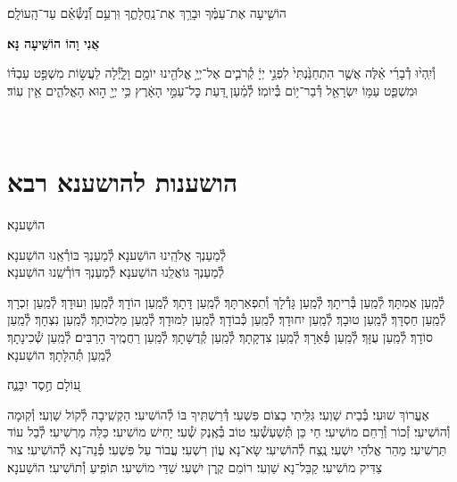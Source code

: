 \documentclass[twoside, openany, parskip=half, 11pt]{book}
\begin{document}
הוֹשִׁ֤יעָה אֶת־עַמֶּ֗ךָ וּבָרֵ֥ךְ אֶת־נַֽחֲלָתֶ֑ךָ וּֽרְעֵ֥ם וְ֯֝נַשְּׂ֯אֵ֗ם עַד־הָֽעוֹלָֽם׃


\begin{large}
\textbf{אֲנִי וָהוֹ הוֹשִֽׁיעָה נָּא׃}
\end{large}

וְ֯יִֽהְי֨וּ דְ֯בָרַ֜י אֵ֗לֶּה אֲשֶׁ֤ר הִתְחַנַּ֙נְתִּי֙ לִפְנֵ֣י יְיָ֔ קְ֯רֹבִ֛ים אֶל־יְיָ֥ אֱלֹהֵ֖ינוּ יוֹמָ֣ם וָלָ֑יְ֯לָה לַעֲשׂ֣וֹת מִשְׁפַּ֣ט עַבְדּ֗וֹ וּמִשְׁפַּ֛ט עַמּ֥וֹ יִשְׂרָאֵ֖ל דְּ֯בַר־י֥וֹם בְּ֯יוֹמֽוֹ׃ לְ֯מַ֗עַן דַּ֚עַת כׇּל־עַמֵּ֣י הָאָ֔רֶץ כִּ֥י יְיָ֖ ה֣וּא הָאֱלֹהִ֑ים אֵ֖ין עֽוֹד׃

\vfill
{}\\

\clearpage

\vspace{-1\baselineskip}
\section[הושענות להושענא רבא]{ הושענות להושענא רבא }

\begin{Large}
הוֹשַׁענָא׃
\end{Large}


לְ֯מַעַנְךָ אֱלֹהֵֽינוּ הוֹשַׁענָא׃ לְ֯מַעַנְךָ בּוֹרְ֯אֵֽנוּ הוֹשַׁענָא׃\\
לְ֯מַעַנְךָ גּוֹאֲלֵֽנוּ הוֹשַׁענָא׃ לְ֯מַעַנְךָ דּוֹרְ֯שֵֽׁנוּ הוֹשַׁענָא׃

לְ֯מַֽעַן אֲמִתָּךְ׃ לְ֯מַֽעַן בְּ֯רִיתָךְ׃ לְ֯מַֽעַן גָּדְ֯לָךְ וְ֯תִפְאַרְתָּךְ׃ לְ֯מַֽעַן דָּתָךְ׃ לְ֯מַֽעַן הוֹדָךְ׃ לְ֯מַֽעַן וִעוּדָךְ׃ לְ֯מַֽעַן זִכְרָךְ׃ לְ֯מַֽעַן חַסְדָּךְ׃ לְ֯מַֽעַן טוּבָךְ׃ לְ֯מַֽעַן יִחוּדָךְ׃ לְ֯מַֽעַן כְּ֯בוֹדָךְ׃ לְ֯מַֽעַן לִמּוּדָךְ׃ לְ֯מַֽעַן מַלְכוּתָךְ׃ לְ֯מַֽעַן נִצְחָךְ׃ לְ֯מַֽעַן סוֹדָךְ׃ לְ֯מַֽעַן עֻזָּךְ׃ לְ֯מַֽעַן פְּ֯אֵרָךְ׃ לְ֯מַֽעַן צִדְקָתָךְ׃ לְ֯מַֽעַן קְ֯דֻשָּׁתָךְ׃ לְ֯מַֽעַן רַחֲמֶֽיךָ הָרַבִּים׃
לְ֯מַֽעַן שְׁ֯כִינָתָךְ׃
לְ֯מַֽעַן תְּ֯הִלָּתָךְ׃ הוֹשַׁענָא׃

ע֭וֹלָם חֶ֣סֶד יִבָּנֶ֑ה׃

אֶעֱרוֹךְ שׁוּעִי׃ בְּ֯בֵית שַׁוְעִי׃ גִּלִּֽיתִי בַצּוֹם פִּשְׁעִי׃ דְּ֯רַשְׁתִּֽיךָ בּוֹ לְ֯הוֹשִׁיעִי׃ הַקְשִֽׁיבָה לְ֯קוֹל שַׁוְעִי׃ וְ֯קֽוּמָה וְ֯הוֹשִׁיעִי׃ זְ֯כוֹר וְ֯רַחֵם מוֹשִׁיעִי׃ חַי כֵּן תְּ֯שַׁעְשְׁ֯עִי׃ טוֹב בְּ֯אֶֽנֶק שְׁ֯עִי׃ יָחִישׁ מוֹשִׁיעִי׃ כַּלֵּה מַרְשִׁיעִי׃ לְ֯בַל עוֹד תַּרְשִׁיעִי׃ מַהֵר אֱלֹהֵי יִשְׁעִי׃ נֶֽצַח לְ֯הוֹשִׁיעִי׃ שָׂא־נָא עֲוֹן רִשְׁעִי׃ עֲבוֹר עַל פִּשְׁעִי׃ פְּ֯נֵה־נָא לְ֯הוֹשִׁיעִי׃ צוּר צַדִּיק מוֹשִׁיעִי׃ קַבֵּל־נָא שַׁוְעִי׃ רוֹמֵם קֶֽרֶן יִשְׁעִי׃
שַׁדַּי מוֹשִׁיעִי׃
תּוֹפִֽיעַ וְ֯תוֹשִׁיעִי׃ הוֹשַׁענָא׃
\end{document}

